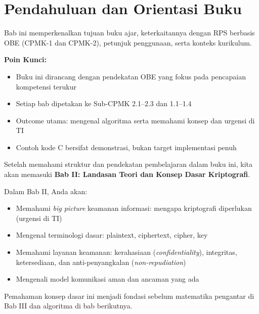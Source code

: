 \documentclass[main.tex]{subfiles}
\begin{document}
\chapter{Pendahuluan dan Orientasi Buku}







\begin{rangkuman}
Bab ini memperkenalkan tujuan buku ajar, keterkaitannya dengan RPS berbasis OBE
(CPMK-1 dan CPMK-2), petunjuk penggunaan, serta konteks kurikulum.

\textbf{Poin Kunci:}
\begin{itemize}
  \item Buku ini dirancang dengan pendekatan OBE yang fokus pada pencapaian kompetensi terukur
  \item Setiap bab dipetakan ke Sub-CPMK 2.1--2.3 dan 1.1--1.4
  \item Outcome utama: mengenal algoritma serta memahami konsep dan urgensi di TI
  \item Contoh kode C bersifat demonstrasi, bukan target implementasi penuh
\end{itemize}
\end{rangkuman}

\begin{transition}
Setelah memahami struktur dan pendekatan pembelajaran dalam buku ini, kita akan memasuki \textbf{Bab II: Landasan Teori dan Konsep Dasar Kriptografi}.

Dalam Bab II, Anda akan:
\begin{itemize}
  \item Memahami \textit{big picture} keamanan informasi: mengapa kriptografi diperlukan (urgensi di TI)
  \item Mengenal terminologi dasar: plaintext, ciphertext, cipher, key
  \item Memahami layanan keamanan: kerahasiaan (\textit{confidentiality}),
        integritas, ketersediaan, dan anti-penyangkalan (\textit{non-repudiation})
  \item Mengenali model komunikasi aman dan ancaman yang ada
\end{itemize}

Pemahaman konsep dasar ini menjadi fondasi sebelum matematika pengantar di Bab III dan algoritma di bab berikutnya.
\end{transition}

\ifSubfilesClassLoaded{
  \renewcommand{\bibname}{Daftar Pustaka}
  
  
}{}
\end{document}
